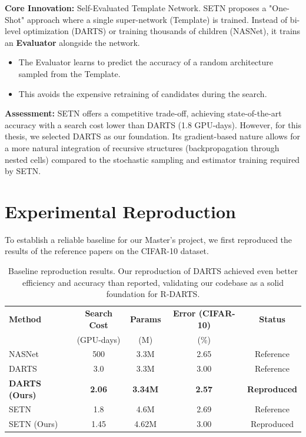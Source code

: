 \documentclass[a4paper,11pt]{article}
\begin{document}
\textbf{Core Innovation:} Self-Evaluated Template Network.
SETN proposes a "One-Shot" approach where a single super-network (Template) is trained. Instead of bi-level optimization (DARTS) or training thousands of children (NASNet), it trains an \textbf{Evaluator} alongside the network.
\begin{itemize}
    \item The Evaluator learns to predict the accuracy of a random architecture sampled from the Template.
    \item This avoids the expensive retraining of candidates during the search.
\end{itemize}

\textbf{Assessment:} SETN offers a competitive trade-off, achieving state-of-the-art accuracy with a search cost lower than DARTS (1.8 GPU-days). However, for this thesis, we selected DARTS as our foundation. Its gradient-based nature allows for a more natural integration of recursive structures (backpropagation through nested cells) compared to the stochastic sampling and estimator training required by SETN.

\section{Experimental Reproduction}
To establish a reliable baseline for our Master's project, we first reproduced the results of the reference papers on the CIFAR-10 dataset.

\begin{table}[H]
\centering
\begin{tabular}{lcccc}
\toprule
\textbf{Method} & \textbf{Search Cost} & \textbf{Params} & \textbf{Error (CIFAR-10)} & \textbf{Status} \\
& (GPU-days) & (M) & (\%) & \\
\midrule
NASNet \cite{zoph2018learning} & 500 & 3.3M & 2.65 & Reference \\
DARTS \cite{liu2018darts} & 3.0 & 3.3M & 3.00 & Reference \\
\textbf{DARTS (Ours)} & \textbf{2.06} & \textbf{3.34M} & \textbf{2.57} & \textbf{Reproduced} \\
SETN \cite{dong2019one} & 1.8 & 4.6M & 2.69 & Reference \\
SETN (Ours) & 1.45 & 4.62M & 3.00 & Reproduced \\
\bottomrule
\end{tabular}
\caption{Baseline reproduction results. Our reproduction of DARTS achieved even better efficiency and accuracy than reported, validating our codebase as a solid foundation for R-DARTS.}
\label{tab:repro}
\end{table}
\end{document}
